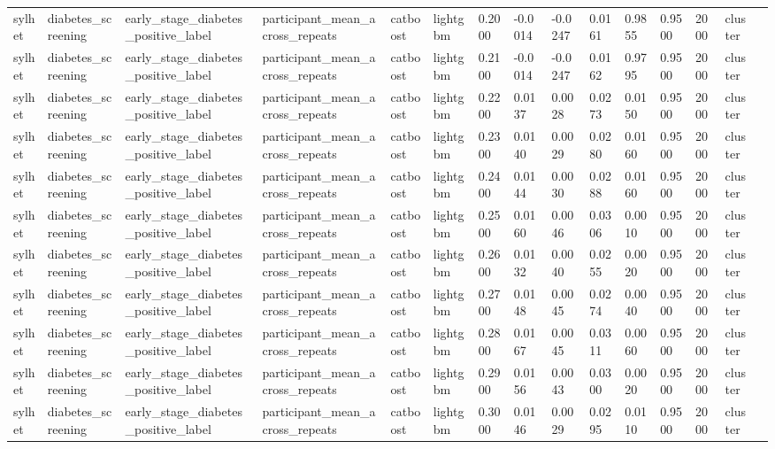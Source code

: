 \begin{tabular}{lllllllllllllll}
sylhet & diabetes\_screening & early\_stage\_diabetes\_positive\_label & participant\_mean\_across\_repeats & catboost & lightgbm & 0.2000 & -0.0014 & -0.0247 & 0.0161 & 0.9855 & 0.9500 & 2000 & cluster &  \\
sylhet & diabetes\_screening & early\_stage\_diabetes\_positive\_label & participant\_mean\_across\_repeats & catboost & lightgbm & 0.2100 & -0.0014 & -0.0247 & 0.0162 & 0.9795 & 0.9500 & 2000 & cluster &  \\
sylhet & diabetes\_screening & early\_stage\_diabetes\_positive\_label & participant\_mean\_across\_repeats & catboost & lightgbm & 0.2200 & 0.0137 & 0.0028 & 0.0273 & 0.0150 & 0.9500 & 2000 & cluster &  \\
sylhet & diabetes\_screening & early\_stage\_diabetes\_positive\_label & participant\_mean\_across\_repeats & catboost & lightgbm & 0.2300 & 0.0140 & 0.0029 & 0.0280 & 0.0160 & 0.9500 & 2000 & cluster &  \\
sylhet & diabetes\_screening & early\_stage\_diabetes\_positive\_label & participant\_mean\_across\_repeats & catboost & lightgbm & 0.2400 & 0.0144 & 0.0030 & 0.0288 & 0.0160 & 0.9500 & 2000 & cluster &  \\
sylhet & diabetes\_screening & early\_stage\_diabetes\_positive\_label & participant\_mean\_across\_repeats & catboost & lightgbm & 0.2500 & 0.0160 & 0.0046 & 0.0306 & 0.0010 & 0.9500 & 2000 & cluster &  \\
sylhet & diabetes\_screening & early\_stage\_diabetes\_positive\_label & participant\_mean\_across\_repeats & catboost & lightgbm & 0.2600 & 0.0132 & 0.0040 & 0.0255 & 0.0020 & 0.9500 & 2000 & cluster &  \\
sylhet & diabetes\_screening & early\_stage\_diabetes\_positive\_label & participant\_mean\_across\_repeats & catboost & lightgbm & 0.2700 & 0.0148 & 0.0045 & 0.0274 & 0.0040 & 0.9500 & 2000 & cluster &  \\
sylhet & diabetes\_screening & early\_stage\_diabetes\_positive\_label & participant\_mean\_across\_repeats & catboost & lightgbm & 0.2800 & 0.0167 & 0.0045 & 0.0311 & 0.0060 & 0.9500 & 2000 & cluster &  \\
sylhet & diabetes\_screening & early\_stage\_diabetes\_positive\_label & participant\_mean\_across\_repeats & catboost & lightgbm & 0.2900 & 0.0156 & 0.0043 & 0.0300 & 0.0020 & 0.9500 & 2000 & cluster &  \\
sylhet & diabetes\_screening & early\_stage\_diabetes\_positive\_label & participant\_mean\_across\_repeats & catboost & lightgbm & 0.3000 & 0.0146 & 0.0029 & 0.0295 & 0.0110 & 0.9500 & 2000 & cluster &  \\

\end{tabular}
